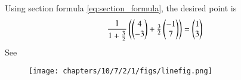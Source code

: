 Using section formula \eqref{eq:section_formula}, the desired point is
\begin{align}
\frac{1}{1+\frac{3}{2}}  \begin{pmatrix}\begin{pmatrix}
4\\
-3
\end{pmatrix}
  +
   \frac{3}{2}\begin{pmatrix}
-1\\
7
\end{pmatrix}\end{pmatrix}
=\begin{pmatrix}
1\\
3
\end{pmatrix}
\end{align}
See 
\begin{figure}[H]
\begin{center}
   \texttt{[image: chapters/10/7/2/1/figs/linefig.png]}
\end{center}
\caption{}
\label{fig:chapters/10/7/2/1/Fig}
\end{figure}

